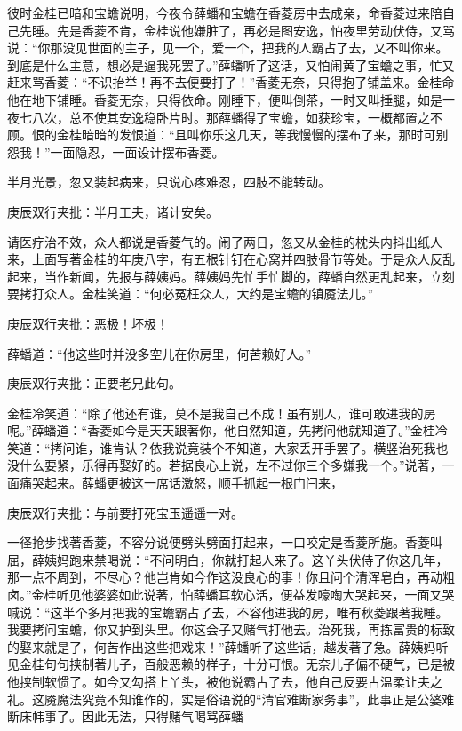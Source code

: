 \begin{parag}
    彼时金桂已暗和宝蟾说明，今夜令薛蟠和宝蟾在香菱房中去成亲，命香菱过来陪自己先睡。先是香菱不肯，金桂说他嫌脏了，再必是图安逸，怕夜里劳动伏侍，又骂说：“你那没见世面的主子，见一个，爱一个，把我的人霸占了去，又不叫你来。到底是什么主意，想必是逼我死罢了。”薛蟠听了这话，又怕闹黄了宝蟾之事，忙又赶来骂香菱：“不识抬举！再不去便要打了！”香菱无奈，只得抱了铺盖来。金桂命他在地下铺睡。香菱无奈，只得依命。刚睡下，便叫倒茶，一时又叫捶腿，如是一夜七八次，总不使其安逸稳卧片时。那薛蟠得了宝蟾，如获珍宝，一概都置之不顾。恨的金桂暗暗的发恨道：“且叫你乐这几天，等我慢慢的摆布了来，那时可别怨我！”一面隐忍，一面设计摆布香菱。
\end{parag}


\begin{parag}
    半月光景，忽又装起病来，只说心疼难忍，四肢不能转动。\begin{note}庚辰双行夹批：半月工夫，诸计安矣。\end{note}请医疗治不效，众人都说是香菱气的。闹了两日，忽又从金桂的枕头内抖出纸人来，上面写著金桂的年庚八字，有五根针钉在心窝并四肢骨节等处。于是众人反乱起来，当作新闻，先报与薛姨妈。薛姨妈先忙手忙脚的，薛蟠自然更乱起来，立刻要拷打众人。金桂笑道：“何必冤枉众人，大约是宝蟾的镇魇法儿。”\begin{note}庚辰双行夹批：恶极！坏极！\end{note}薛蟠道：“他这些时并没多空儿在你房里，何苦赖好人。”\begin{note}庚辰双行夹批：正要老兄此句。\end{note}金桂冷笑道：“除了他还有谁，莫不是我自己不成！虽有别人，谁可敢进我的房呢。”薛蟠道：“香菱如今是天天跟著你，他自然知道，先拷问他就知道了。”金桂冷笑道：“拷问谁，谁肯认？依我说竟装个不知道，大家丢开手罢了。横竖治死我也没什么要紧，乐得再娶好的。若据良心上说，左不过你三个多嫌我一个。”说著，一面痛哭起来。薛蟠更被这一席话激怒，顺手抓起一根门闩来，\begin{note}庚辰双行夹批：与前要打死宝玉遥遥一对。\end{note}一径抢步找著香菱，不容分说便劈头劈面打起来，一口咬定是香菱所施。香菱叫屈，薛姨妈跑来禁喝说：“不问明白，你就打起人来了。这丫头伏侍了你这几年，那一点不周到，不尽心？他岂肯如今作这没良心的事！你且问个清浑皂白，再动粗卤。”金桂听见他婆婆如此说著，怕薛蟠耳软心活，便益发嚎啕大哭起来，一面又哭喊说：“这半个多月把我的宝蟾霸占了去，不容他进我的房，唯有秋菱跟著我睡。我要拷问宝蟾，你又护到头里。你这会子又赌气打他去。治死我，再拣富贵的标致的娶来就是了，何苦作出这些把戏来！”薛蟠听了这些话，越发著了急。薛姨妈听见金桂句句挟制著儿子，百般恶赖的样子，十分可恨。无奈儿子偏不硬气，已是被他挟制软惯了。如今又勾搭上丫头，被他说霸占了去，他自己反要占温柔让夫之礼。这魇魔法究竟不知谁作的，实是俗语说的“清官难断家务事”，此事正是公婆难断床帏事了。因此无法，只得赌气喝骂薛蟠
\end{parag}
